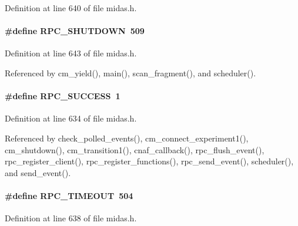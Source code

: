 Definition at line 640 of file midas.h.
\paragraph[{RPC\_\-SHUTDOWN}]{\setlength{\rightskip}{0pt plus 5cm}\#define RPC\_\-SHUTDOWN~509}\hfill\label{group__err25_ga0406ee07e8c5afbf8e46cb0eed698bcd}

\begin{DoxyItemize}
\item 
\end{DoxyItemize}

Definition at line 643 of file midas.h.

Referenced by cm\_\-yield(), main(), scan\_\-fragment(), and scheduler().
\paragraph[{RPC\_\-SUCCESS}]{\setlength{\rightskip}{0pt plus 5cm}\#define RPC\_\-SUCCESS~1}\hfill\label{group__err25_ga19b06966ce058cda8e5dca8d682b2bd3}

\begin{DoxyItemize}
\item 
\end{DoxyItemize}

Definition at line 634 of file midas.h.

Referenced by check\_\-polled\_\-events(), cm\_\-connect\_\-experiment1(), cm\_\-shutdown(), cm\_\-transition1(), cnaf\_\-callback(), rpc\_\-flush\_\-event(), rpc\_\-register\_\-client(), rpc\_\-register\_\-functions(), rpc\_\-send\_\-event(), scheduler(), and send\_\-event().
\paragraph[{RPC\_\-TIMEOUT}]{\setlength{\rightskip}{0pt plus 5cm}\#define RPC\_\-TIMEOUT~504}\hfill\label{group__err25_gad29d62bce98ff8494be9337cb1a0a1f1}

\begin{DoxyItemize}
\item 
\end{DoxyItemize}

Definition at line 638 of file midas.h.